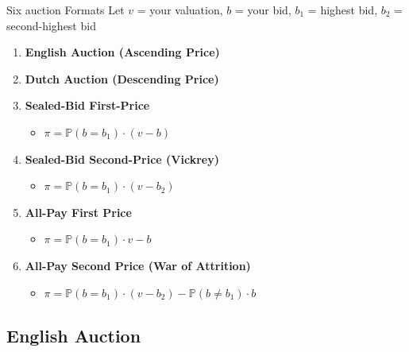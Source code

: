 \documentclass[xcolor={x11names}]{beamer}
\begin{document}
\begin{frame}{Six auction Formats}
Let $v$ = your valuation, $b$ = your bid, $b_1$ = highest bid, $b_2$ = second-highest bid

\begin{enumerate}
  \item \textbf{English Auction (Ascending Price)}
  \item \textbf{Dutch Auction (Descending Price)}
  
  \item \textbf{Sealed-Bid First-Price}
  \begin{itemize}
    \item[] $\pi = \mathbb{P}(b = b_1) \cdot (v - b)$
  \end{itemize}
  
  \item \textbf{Sealed-Bid Second-Price (Vickrey)}
  \begin{itemize}
    \item[] $\pi = \mathbb{P}(b = b_1) \cdot (v - b_2)$
  \end{itemize}
  
  \item \textbf{All-Pay First Price}
  \begin{itemize}
    \item[] $\pi = \mathbb{P}(b = b_1) \cdot v - b$
  \end{itemize}
  
  \item \textbf{All-Pay Second Price (War of Attrition)}
  \begin{itemize}
    \item[] $\pi = \mathbb{P}(b = b_1) \cdot (v - b_2) - \mathbb{P}(b \neq b_1) \cdot b$
  \end{itemize}
\end{enumerate}

\end{frame}

\subsection{English Auction}
\end{document}
